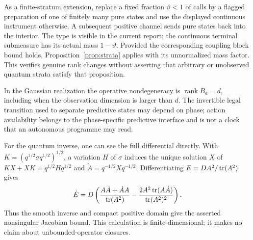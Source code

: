 As a finite-stratum extension, replace a fixed fraction $\vartheta<1$ of calls by a flagged preparation of one of finitely many pure states and use the displayed continuous instrument otherwise. A subsequent positive channel sends pure states back into the interior. The type is visible in the current report; the continuous terminal submeasure has its actual mass $1-\vartheta$. Provided the corresponding coupling block bound holds, Proposition~\ref{prop:strata} applies with its unnormalized mass factor. This verifies genuine rank changes without asserting that arbitrary or unobserved quantum strata satisfy that proposition.

In the Gaussian realization the operative nondegeneracy is $\operatorname{rank}B_a=d$, including when the observation dimension is larger than $d$. The invertible legal transition used to separate predictive states may depend on phase; action availability belongs to the phase-specific predictive interface and is not a clock that an autonomous programme may read.

For the quantum inverse, one can see the full differential directly. With $K=(q^{1/2}\sigma q^{1/2})^{1/2}$, a variation $H$ of $\sigma$ induces the unique solution $X$ of $KX+XK=q^{1/2}Hq^{1/2}$ and $\dot A=q^{-1/2}Xq^{-1/2}$. Differentiating $E=DA^2/\operatorname{tr}(A^2)$ gives
\[
 \dot E=D\left(\frac{A\dot A+\dot A A}{\operatorname{tr}(A^2)}
       -\frac{2A^2\operatorname{tr}(A\dot A)}{\operatorname{tr}(A^2)^2}\right).
\]
Thus the smooth inverse and compact positive domain give the asserted nonsingular Jacobian bound. This calculation is finite-dimensional; it makes no claim about unbounded-operator closures.
